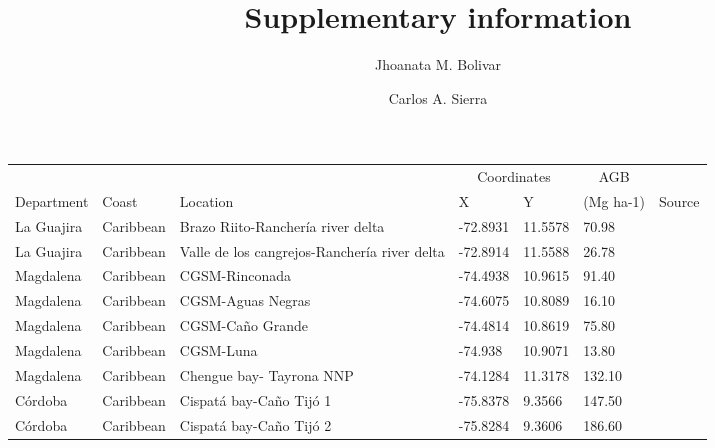 \documentclass[review, authoryear]{elsarticle}   	%
\begin{document}
\begin{frontmatter}

\title{Supplementary information}
\author[MPI,CYB]{Jhoanata M. Bolivar}
\author[MPI,CYB]{Carlos A. Sierra}
\address[MPI]{Max Planck Institute for Biogeochemistry, Hans-Kn\"oll-Str. 10, 07745 Jena, Germany}
\address[CYB]{Research Center on Ecosystems and Global Change Carbono \& Bosques, Medell\'in, Colombia}


\end{frontmatter}


\begin{table}[htbp]
   \centering \tiny
   \begin{tabular}{p{2.0cm}p{2.0cm}p{4.0cm}p{1.0cm}p{1.0cm}p{2.0cm}p{2.5cm}} %
      \toprule 
        &&&\multicolumn{2}{c}{Coordinates}&\multicolumn{1}{c}{AGB}&\\      
      Department&Coast&Location&X&Y&(Mg ha-1)&Source\\
            \midrule 
La Guajira&Caribbean&Brazo Riito-Rancher\'{i}a river delta&-72.8931&11.5578&70.98&\citet{Lema2007}\\ 
La Guajira&Caribbean&Valle de los cangrejos-Rancher\'{i}a river delta&-72.8914&11.5588&26.78&\citet{Lema2007}\\ 
Magdalena&Caribbean&CGSM-Rinconada&-74.4938&10.9615&91.40&\citet{DelaPena2010}\\ 
Magdalena&Caribbean&CGSM-Aguas Negras&-74.6075&10.8089&16.10&\citet{DelaPena2010}\\ 
Magdalena&Caribbean&CGSM-Ca\~{n}o Grande&-74.4814&10.8619&75.80&\citet{DelaPena2010}\\ 
Magdalena&Caribbean&CGSM-Luna&-74.938&10.9071&13.80&\citet{DelaPena2010}\\ 
Magdalena&Caribbean&Chengue bay- Tayrona NNP&-74.1284&11.3178&132.10&\citet{INVEMAR2007}\\ 
C\'{o}rdoba&Caribbean&Cispat\'{a} bay-Ca\~{n}o Tij\'{o} 1&-75.8378&9.3566&147.50&\citet{Bolivar_inpreparation}\\ 
C\'{o}rdoba&Caribbean&Cispat\'{a} bay-Ca\~{n}o Tij\'{o} 2&-75.8284&9.3606&186.60&\citet{Bolivar_inpreparation}\\ 

\end{tabular}
\end{table}
\end{document}
